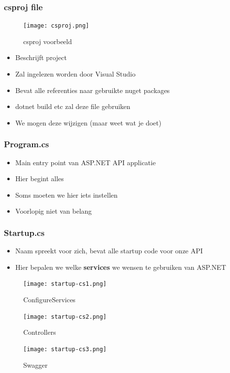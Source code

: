 \documentclass{article}
\begin{document}
\subsubsection{csproj file}

\begin{figure}[H]
    \centering
    \texttt{[image: csproj.png]}
    \caption{csproj voorbeeld}
\end{figure}

\begin{itemize}
    \item Beschrijft project
    \item Zal ingelezen worden door Visual Studio
    \item Bevat alle referenties naar gebruikte nuget packages
    \item dotnet build etc zal deze file gebruiken
    \item We mogen deze wijzigen (maar weet wat je doet)
\end{itemize}



\subsubsection{Program.cs}

\begin{itemize}
    \item Main entry point van ASP.NET API applicatie
    \item Hier begint alles
    \item Soms moeten we hier iets instellen
    \item Voorlopig niet van belang
\end{itemize}

\subsubsection{Startup.cs}

\begin{itemize}
    \item Naam spreekt voor zich, bevat alle startup code voor onze API
    \item Hier bepalen we welke \textbf{services} we wensen te gebruiken van ASP.NET 
        
        
\end{itemize}

\begin{figure}[H]
    \centering
    \texttt{[image: startup-cs1.png]}
    \caption{ConfigureServices}
\end{figure}
\begin{figure}[H]
    \centering
    \texttt{[image: startup-cs2.png]}
    \caption{Controllers}
\end{figure}
\begin{figure}[H]
    \centering
    \texttt{[image: startup-cs3.png]}
    \caption{Swagger}
\end{figure}
\end{document}
